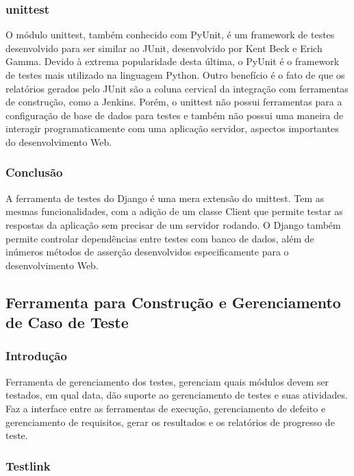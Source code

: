 \documentclass[12pt,a4paper]{article}
\begin{document}
		\subsubsection{unittest}
		
			O módulo unittest, também conhecido com PyUnit, é um framework de testes desenvolvido
			para ser similar ao JUnit, desenvolvido por Kent Beck e Erich Gamma. Devido à extrema
			popularidade desta última, o PyUnit é o framework de testes mais utilizado na linguagem
			Python. Outro benefício é o fato de que os relatórios gerados pelo JUnit são a coluna
			cervical da integração com ferramentas de construção, como a Jenkins.
			Porém, o unittest não possui ferramentas para a configuração de base de dados para testes
			e também não possui uma maneira de interagir programaticamente com uma aplicação servidor,
			aspectos importantes do desenvolvimento Web.
		
		\subsubsection{Conclusão}
		
			A ferramenta de testes do Django é uma mera extensão do unittest. Tem as mesmas funcionalidades,
			com a adição de um classe Client que permite testar as respostas da aplicação sem precisar
			de um servidor rodando. O Django também permite controlar dependências entre testes com
			banco de dados, além de inúmeros métodos de asserção desenvolvidos especificamente para
			o desenvolvimento Web.

	\clearpage		
	\subsection{Ferramenta para Construção e Gerenciamento de Caso de Teste}
	
		\subsubsection{Introdução}
		
			Ferramenta de gerenciamento dos testes, gerenciam quais módulos devem ser testados, em qual data, 
			dão suporte ao gerenciamento de testes e suas atividades. Faz a interface entre as ferramentas de execução, 
			gerenciamento de defeito e gerenciamento de requisitos, gerar os resultados e os relatórios de progresso de teste.
		
		\subsubsection{Testlink}
		
\end{document}
